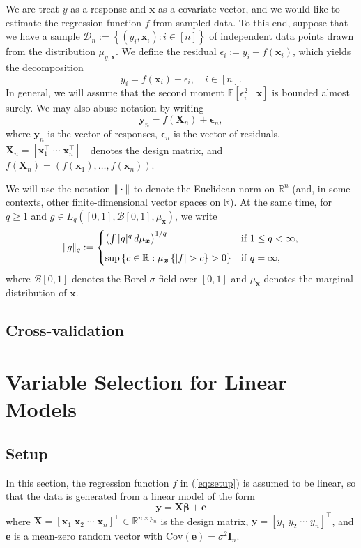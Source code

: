\documentclass[11pt, letter paper]{article}
\newcommand{\1}{\mathmybb{1}}
\newcommand{\R}{\mathbb{R}}
\newcommand{\0}{\emptyset}
\newcommand{\Ep}[1]{\mathbb{E}\left[ #1 \right]}
\newcommand{\paren}[1]{\left(#1 \right)}
\newcommand{\sqbr}[1]{\left[#1 \right]}
\newcommand{\set}[1]{\left\{ #1 \right\}}
\newcommand{\norm}[1]{|\hspace{-1pt}|#1 |\hspace{-1pt}|}
\newcommand{\data}{\mathcal{D}_{n}}
\newcommand{\X}{\boldsymbol{X}}
\newcommand{\x}{\boldsymbol{x}}
\newcommand{\y}{\boldsymbol{y}}
\newcommand{\e}{\boldsymbol{e}}
\newcommand{\Cov}[1]{\mathrm{Cov}\paren{#1}}
\newcommand{\bbeta}{\boldsymbol{\beta}}
\newcommand{\bepsilon}{\boldsymbol{\epsilon}}
\begin{document}
We are treat \(y\) as a response and \(\x\) as a covariate vector, and we would like to estimate the regression function \(f\) from sampled data. To this end, suppose that we have a sample \(\data := \set{\paren{y_{i}, \x_{i}}:i\in [n]}\) of independent data points drawn from the distribution \(\mu_{y, \x}\). We define the residual \(\epsilon_{i}:= y_{i} - f(\x_{i})\), which yields the decomposition
\[y_{i} = f(\x_{i}) + \epsilon_{i}, \quad i\in[n].\]
In general, we will assume that the second moment \(\Ep{\epsilon^{2}_{i}\mid\x}\) is bounded almost surely. We may also abuse notation by writing
\[\y_{n} = f(\X_{n}) + \bepsilon_{n},\]
where  \(\y_{n}\) is the vector of responses, \(\bepsilon_{n}\) is the vector of residuals, \(\X_{n} = [\x_{1}^{\top}\;\cdots\;\x_{n}^{\top}]^{\top}\) denotes the design matrix, and \(f(\X_{n}) = (f(\x_{1}),\ldots,f(\x_{n}))\).

We will use the notation \(\norm{\cdot}\) to denote the Euclidean norm on \(\R^{n}\) (and, in some contexts, other finite-dimensional vector spaces on \(\R\)). At the same time, for \(q\geq 1\) and \(g\in L_{q}([0,1], \mathcal{B}[0,1], \mu_{\x})\), we write 
\[\norm{g}_{q} := \begin{cases}
    \paren{\int|g|^{q}\,d\mu_{\x}}^{1/q}&\text{if }1\leq q < \infty,\\[2mm]
    \sup\set{c\in\R:\mu_{\x}\set{|f|>c}>0} &\text{if } q = \infty,
\end{cases}\]
where \(\mathcal{B}[0,1]\) denotes the Borel \(\sigma\)-field over \([0,1]\) and \(\mu_{\x}\) denotes the marginal distribution of \(\x\).


\subsection{Cross-validation}

\newpage
\section{Variable Selection for Linear Models}
\subsection{Setup}\label{sec:lmsetup}
In this section, the regression function \(f\) in (\ref{eq:setup}) is assumed to be linear, so that the data is generated from a linear model of the form
\[\y = \X\bbeta + \e\]
where \(\X = {[\x_{1}\;\x_{2}\;\cdots\;\x_{n}]}^{\top}\in\R^{n\times p_{n}}\) is the design matrix, \(\y = \sqbr{y_{1}\; y_{2}\;\cdots\; y_{n}}^{\top}\), and \(\e\) is a mean-zero random vector with \(\Cov{\e} = \sigma^{2}\boldsymbol{I}_{n}\).
\end{document}
